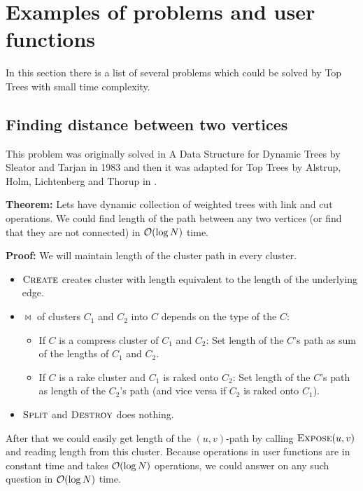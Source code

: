 \chapter{Examples of problems and user functions}
\label{chap:Problems}

In this section there is a list of several problems which could be solved by
Top Trees with small time complexity.

\section{Finding distance between two vertices}

This problem was originally solved in {\I A Data Structure for Dynamic Trees}
\cite{DSforDynamicTrees} by Sleator and Tarjan in 1983 and then it was adapted
for Top Trees by Alstrup, Holm, Lichtenberg and Thorup in \cite{TopTrees}.

{\bf Theorem:} Lets have dynamic collection of weighted trees with link and cut
operations. We could find length of the path between any two vertices (or find
that they are not connected) in ${\cal O}(\log N)$ time.

\medskip\noindent
{\bf Proof:} We will maintain length of the cluster path in every cluster.

\begin{itemize}

\item $\hbox{\sc Create}$ creates cluster with length equivalent to the length of the
underlying edge.

\item $\Join$ of clusters $C_1$ and $C_2$ into $C$ depends on the type of the $C$:
	\begin{itemize}
	\item If $C$ is a compress cluster of $C_1$ and $C_2$:
	Set length of the $C$'s path as sum of the lengths of $C_1$ and $C_2$.
	\item If $C$ is a rake cluster and $C_1$ is raked onto $C_2$:
	Set length of the $C$'s path as length of the $C_2$'s path (and vice
	versa if $C_2$ is raked onto $C_1$).
	\end{itemize}

\item $\hbox{\sc Split}$ and $\hbox{\sc Destroy}$ does nothing.

\end{itemize}

After that we could easily get length of the $(u,v)$-path by calling
$\hbox{\sc Expose}(u,v)$ and reading length from this cluster. Because operations
in user functions are in constant time and \Expose{} takes ${\cal O}(\log N)$
operations, we could answer on any such question in ${\cal O}(\log N)$ time.

